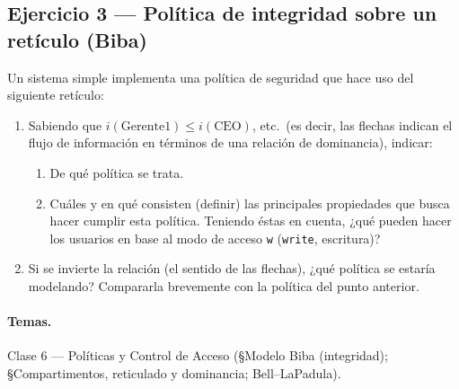 \subsection{Ejercicio 3 — Política de integridad sobre un retículo (Biba)}

\begin{consigna}
Un sistema simple implementa una política de seguridad que hace uso del siguiente retículo:
\begin{center}
\end{center}
\begin{enumerate}[label=\alph*)]
  \item Sabiendo que $i(\text{Gerente1}) \le i(\text{CEO})$, etc.\ (es decir, las flechas
        indican el flujo de información en términos de una relación de dominancia), indicar:
        \begin{enumerate}[label=\roman*.]
          \item De qué política se trata.
          \item Cuáles y en qué consisten (definir) las principales propiedades que busca hacer
                cumplir esta política. Teniendo éstas en cuenta, ¿qué pueden hacer los usuarios
                en base al modo de acceso \texttt{w} (\texttt{write}, escritura)?
        \end{enumerate}
  \item Si se invierte la relación (el sentido de las flechas), ¿qué política se estaría
        modelando? Compararla brevemente con la política del punto anterior.
\end{enumerate}
\end{consigna}

\paragraph{Temas.} Clase 6 — Políticas y Control de Acceso (\S Modelo Biba (integridad);
\S Compartimentos, reticulado y dominancia; Bell--LaPadula).

